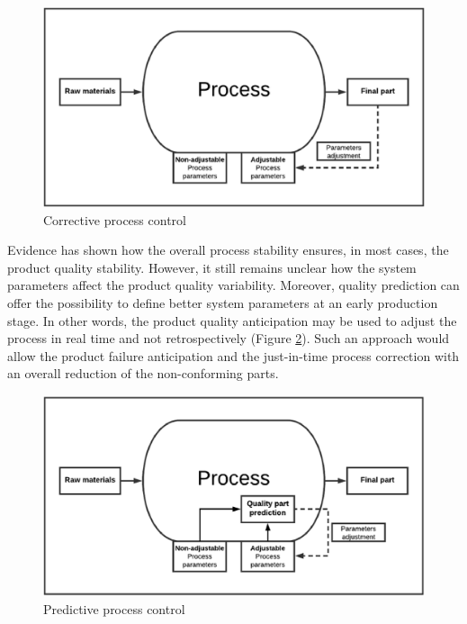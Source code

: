 \begin{figure}
\centerline{\includegraphics[scale=0.7]{images/chapter_3/corrective_approach.eps}}
\caption{Corrective process control}
\label{fig:Corrective process control}
\end{figure}

Evidence has shown how the overall process stability ensures, in most cases, the product quality stability. However, it still remains unclear how the system parameters affect the product quality variability. Moreover, quality prediction can offer the possibility to define better system parameters at an early production stage. In other words, the product quality anticipation may be used to adjust the process in real time and not retrospectively (Figure \ref{fig:Predictive process control}). Such an approach would allow the product failure anticipation and the just-in-time process correction with an overall reduction of the non-conforming parts.

\begin{figure}
\centerline{\includegraphics[scale=0.7]{images/chapter_3/predictive_approach.eps}}
\caption{Predictive process control}
\label{fig:Predictive process control}
\end{figure}


